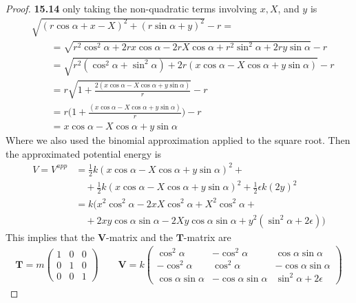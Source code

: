 \documentclass[11pt]{article}
\theoremstyle{definition}
\begin{document}
\begin{proof}{\textbf{15.14}}
    only taking the non-quadratic terms involving $x,X$, and $y$ is
    \begin{align*}
        &\sqrt{(r\cos\alpha + x - X)^2 + (r\sin\alpha + y)^2} - r =\\
        &\qquad=
        \sqrt{r^2\cos^2\alpha + 2rx\cos\alpha - 2rX\cos\alpha + 
        r^2\sin^2\alpha + 2ry\sin\alpha} - r\\
        &\qquad=
        \sqrt{r^2(\cos^2\alpha + \sin^2\alpha) + 2r(x\cos\alpha
        - X\cos\alpha + y\sin\alpha)} - r\\
        &\qquad=
        r\sqrt{1 + \frac{2(x\cos\alpha - X\cos\alpha + y\sin\alpha)}{r}} - r\\
        &\qquad=
        r\bigg(1 + \frac{(x\cos\alpha - X\cos\alpha + y\sin\alpha)}{r}\bigg) - r\\
        &\qquad= x\cos\alpha - X\cos\alpha + y\sin\alpha
    \end{align*}
    Where we also used the binomial approximation applied to the square root.
    Then the approximated potential energy is
    \begin{align*}
        V = V^{app} &= \frac{1}{2}k(x\cos\alpha - X\cos\alpha + y\sin\alpha)^2 +\\
        &\quad+ \frac{1}{2}k(x\cos\alpha - X\cos\alpha + y\sin\alpha)^2
        + \frac{1}{2}\epsilon k(2y)^2\\
        &= k(x^2\cos^2\alpha - 2xX\cos^2\alpha + X^2\cos^2\alpha + \\
        &\quad + 2xy\cos\alpha\sin\alpha - 2Xy\cos\alpha\sin\alpha +
        y^2(\sin^2\alpha + 2\epsilon))
    \end{align*}
    This implies that the $\bm{V}$-matrix and the $\bm{T}$-matrix are 
    \begin{align*}
        \bm{T} = m\begin{pmatrix}
            1 & 0 & 0 \\
            0 & 1 & 0 \\
            0 & 0 & 1
        \end{pmatrix}
        \quad\quad
        \bm{V} = k\begin{pmatrix}
            \cos^2\alpha & -\cos^2\alpha & \cos\alpha\sin\alpha\\
            -\cos^2\alpha & \cos^2\alpha & -\cos\alpha\sin\alpha\\
            \cos\alpha\sin\alpha & -\cos\alpha\sin\alpha & \sin^2\alpha + 2\epsilon
        \end{pmatrix}
    \end{align*}

\end{proof}
\end{document}
